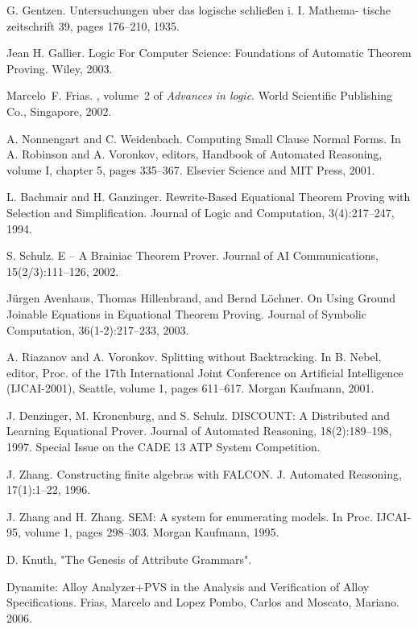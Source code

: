 \begin{thebibliography}{tesis}
	G. Gentzen. Untersuchungen uber das logische schließen i. I. Mathema- tische zeitschrift 39, pages 176–210, 1935.
	
	Jean H. Gallier. Logic For Computer Science: Foundations of Automatic Theorem Proving. Wiley, 2003.

Marcelo~{F.} Frias.
, volume~2
  of {\em Advances in logic}.
\newblock World Scientific Publishing Co., Singapore, 2002.

	A. Nonnengart and C. Weidenbach. Computing Small Clause Normal Forms. In A. Robinson and A. Voronkov, editors, Handbook of Automated Reasoning, volume I, chapter 5, pages 335–367. Elsevier Science and MIT Press, 2001.

	L. Bachmair and H. Ganzinger. Rewrite-Based Equational Theorem Proving with Selection and Simplification. Journal of Logic and Computation, 3(4):217–247, 1994.

S. Schulz. E – A Brainiac Theorem Prover. Journal of AI Communications, 15(2/3):111–126, 2002.

Jürgen Avenhaus, Thomas Hillenbrand, and Bernd Löchner. On Using Ground Joinable Equations in Equational Theorem Proving. Journal of Symbolic Computation, 36(1-2):217–233, 2003.

A. Riazanov and A. Voronkov. Splitting without Backtracking. In B. Nebel, editor, Proc. of the 17th International Joint Conference on Artificial Intelligence (IJCAI-2001), Seattle, volume 1, pages 611–617. Morgan Kaufmann, 2001.

J. Denzinger, M. Kronenburg, and S. Schulz. DISCOUNT: A Distributed and Learning Equational Prover. Journal of Automated Reasoning, 18(2):189–198, 1997. Special Issue on the CADE 13 ATP System Competition.

 J. Zhang. Constructing finite algebras with FALCON. J. Automated Reasoning, 17(1):1–22,
1996.

 J. Zhang and H. Zhang. SEM: A system for enumerating models. In Proc. IJCAI-95,
volume 1, pages 298–303. Morgan Kaufmann, 1995.

 D. Knuth, "The Genesis of Attribute Grammars".

 Dynamite: Alloy Analyzer+PVS in the Analysis and Verification of Alloy Specifications. Frias, Marcelo and Lopez Pombo, Carlos and Moscato, Mariano. 2006.


\end{thebibliography}

